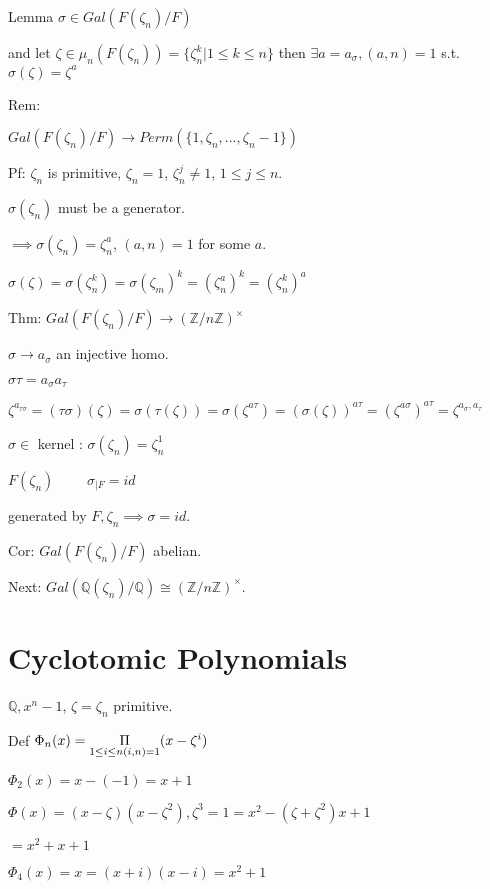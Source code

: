 \documentclass[twoside]{article}
\newcommand{\Z}{\mathbb{Z}}
\newcommand{\Q}{\mathbb{Q}}
\newcommand{\zn}{\zeta_n}
\begin{document}
    Lemma $\sigma \in Gal(F(\zn)/F)$

    and let $\zeta \in \mu_n(F(\zn)) = \{\zn^k \vert 1 \leq k \leq n\}$ then $\exists a = a_\sigma, (a,n) = 1$ s.t. $\sigma(\zeta) = \zeta^a$

    Rem:

    $Gal(F(\zeta_n)/F) \rightarrow Perm(\{1,\zn, ..., \zn - 1 \})$

    Pf: $\zn$ is primitive, $\zn = 1$, $\zn^j \neq 1$, $1 \leq j \leq n$.

    $\sigma(\zn)$ must be a generator. 

    $\implies \sigma(\zn) = \zn^a$, $(a,n) = 1$ for some $a$.

    $\sigma(\zeta) = \sigma(\zeta^k_n) = \sigma(\zeta_m)^k = (\zeta_n^a)^k = (\zeta_n^k)^a$

    Thm: $Gal(F(\zn)/F) \rightarrow (\Z/n\Z)^\times$

    $\sigma \rightarrow a_\sigma$ an injective homo. 


    $\sigma \tau = a_\sigma a_\tau$

    $\zeta^{a_{\tau\sigma}} = (\tau\sigma)(\zeta) = \sigma(\tau(\zeta)) = \sigma(\zeta^{a\tau}) = (\sigma(\zeta))^{a\tau} = (\zeta^{a\sigma})^{a\tau} = \zeta^{a_\sigma, a_\tau}$ 

    $\sigma \in$ kernel : $\sigma(\zeta_n) = \zeta^1_n$


    $F(\zn)$ \ \ \  \ $\sigma_{\vert F} = id$

    generated by $F, \zn \implies \sigma = id$. 

    Cor: $Gal(F(\zn)/F)$ abelian. 

    Next: $Gal(\Q(\zn)/\Q) \cong (\Z/n\Z)^\times$.
    
    \section{Cyclotomic Polynomials}

    $\Q, x^n - 1$, $\zeta = \zn$ primitive.

    Def $\Phi_n(x) = \underset{1 \leq i \leq n \\ (i,n) = 1}\Pi(x - \zeta^i)$

    $\Phi_2(x) = x -(-1) = x+1$

    $\Phi (x) = (x - \zeta)(x - \zeta^2), \zeta^3 = 1 = x^2 - (\zeta + \zeta^2)x + 1$

    $= x^2 + x+1$

    $\Phi_4(x) = x = (x+i)(x-i) = x^2 + 1$ 
\end{document}
